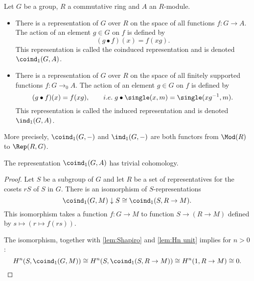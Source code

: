 \begin{definition} \label{def:induced}
	\leanok
	Let $G$ be a group, $R$ a commutative ring and $A$ an $R$-module.
	\begin{itemize}
		\item
		There is a representation of $G$ over $R$
		on the space of all functions $f : G \to A$. The action of an element $g \in G$ on $f$
		is defined by
		\[
			(g \bullet f) (x) = f(xg).
		\]
		This representation is called the coinduced representation and is denoted $\coind_1(G,A)$.
		\item
		There is a representation of $G$ over $R$
		on the space of all finitely supported functions $f : G \to_0 A$.
		The action of an element $g \in G$ on $f$ is defined by
		\[
			(g \bullet f) (x) = f(xg), \qquad i.e.\;
			g \bullet \single(x,m) = \single(xg^{-1},m).
		\]
		This representation is called the induced representation and is denoted $\ind_1(G,A)$.
	\end{itemize}
	More precisely, $\coind_1(G,-)$ and $\ind_1(G,-)$ are both functors from $\Mod(R)$ to $\Rep(R,G)$.
\end{definition}

\begin{lemma}	\label{lem:coind₁ trivial cohomology}
	\leanok
	The representation $\coind_1(G,A)$ has trivial cohomology.
\end{lemma}

\begin{proof}
	Let $S$ be a subgroup of $G$ and let $R$ be a set of representatives for the cosets $rS$
	of $S$ in $G$.
	There is an isomorphism of $S$-representations
	\[
		\coind_1(G,M) \downarrow S
		\cong
		\coind_1(S,R \to M).
	\]
	This isomorphism takes a function $f : G \to M$ to function $S \to (R \to M)$
	defined by $s \mapsto (r \mapsto f(rs))$.

	The isomorphism, together with \ref{lem:Shapiro} and \ref{lem:Hn unit} implies for $n >0$:
	\[
		H^n(S,\coind_1(G,M)) \cong
		H^n(S,\coind_1(S,R \to M)) \cong
		H^n(1,R \to M) \cong 0.
	\]
\end{proof}




